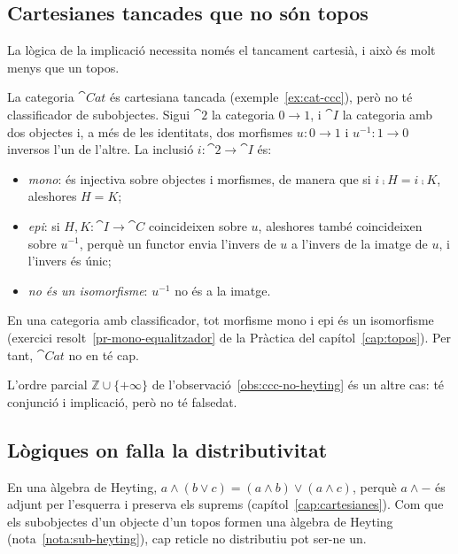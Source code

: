 \subsection{Cartesianes tancades que no són topos}

La lògica de la implicació necessita només el tancament cartesià, i això és molt menys que un topos.

\begin{exemple}
La categoria $\cat{Cat}$ és cartesiana tancada (exemple~\ref{ex:cat-ccc}), però no té classificador de subobjectes. Sigui $\cat{2}$ la categoria $0\to1$, i $\cat{I}$ la categoria amb dos objectes i, a més de les identitats, dos morfismes $u\colon0\to1$ i $u^{-1}\colon1\to0$ inversos l'un de l'altre. La inclusió $i\colon\cat{2}\to\cat{I}$ és:
\begin{itemize}
\item \emph{mono}: és injectiva sobre objectes i morfismes, de manera que si $i\comp H=i\comp K$, aleshores $H=K$;
\item \emph{epi}: si $H,K\colon\cat{I}\to\cat{C}$ coincideixen sobre $u$, aleshores també coincideixen sobre $u^{-1}$, perquè un functor envia l'invers de $u$ a l'invers de la imatge de $u$, i l'invers és únic;
\item \emph{no és un isomorfisme}: $u^{-1}$ no és a la imatge.
\end{itemize}
En una categoria amb classificador, tot morfisme mono i epi és un isomorfisme (exercici resolt~\ref{pr-mono-equalitzador} de la Pràctica del capítol~\ref{cap:topos}). Per tant, $\cat{Cat}$ no en té cap.
\end{exemple}

L'ordre parcial $\mathbb Z\cup\{+\infty\}$ de l'observació~\ref{obs:ccc-no-heyting} és un altre cas: té conjunció i implicació, però no té falsedat.

\subsection{Lògiques on falla la distributivitat}

En una àlgebra de Heyting, $a\wedge(b\vee c)=(a\wedge b)\vee(a\wedge c)$, perquè $a\wedge-$ és adjunt per l'esquerra i preserva els suprems (capítol~\ref{cap:cartesianes}). Com que els subobjectes d'un objecte d'un topos formen una àlgebra de Heyting (nota~\ref{nota:sub-heyting}), cap reticle no distributiu pot ser-ne un.

